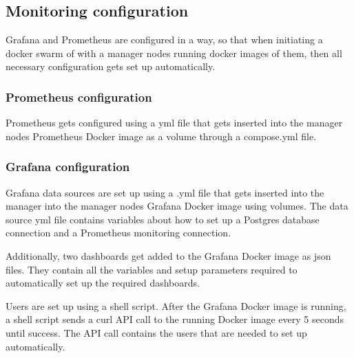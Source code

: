 \subsection{Monitoring configuration}

Grafana and Prometheus are configured in a way, so that when initiating a docker swarm of with a manager nodes running docker images of them, then all necessary configuration gets set up automatically.

\subsubsection{Prometheus configuration}

Prometheus gets configured using a yml file that gets inserted into the manager nodes Prometheus Docker image as a volume through a compose.yml file.

\subsubsection{Grafana configuration}

Grafana data sources are set up using a .yml file that gets inserted into the manager into the manager nodes Grafana Docker image using volumes. 
The data source yml file contains variables about how to set up a Postgres database connection and a Prometheus monitoring connection.

Additionally, two dashboards get added to the Grafana Docker image as json files. 
They contain all the variables and setup parameters required to automatically set up the required dashboards.

Users are set up using a shell script. 
After the Grafana Docker image is running, a shell script sends a curl API call to the running Docker image every 5 seconds until success. 
The API call contains the users that are needed to set up automatically.
